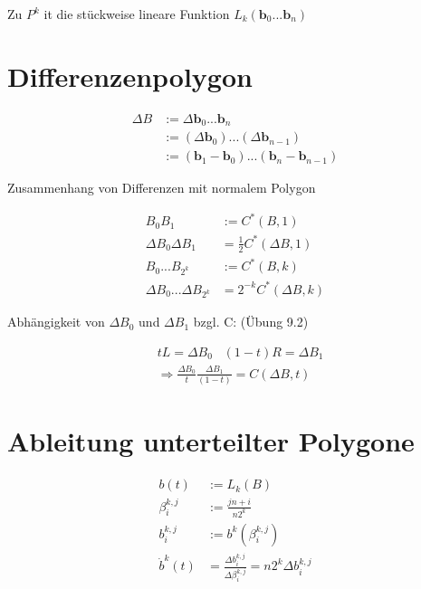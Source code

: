 \documentclass[8pt, DIV15, twocolumn]{scrartcl}
\begin{document}
Zu $P^k$ it die stückweise lineare Funktion $L_k \left( \mathbf{b}_0 ... \mathbf{b}_n \right)$

\section*{Differenzenpolygon}

\begin{equation*}
\begin{aligned}
\Delta B &:= \Delta \mathbf{b}_0 ... \mathbf{b}_n \\
&:= \left(\Delta \mathbf{b}_0 \right) ... \left( \Delta \mathbf{b}_{n-1} \right) \\
&:= \left( \mathbf{b}_1 - \mathbf{b}_0 \right) ... \left( \mathbf{b}_n - \mathbf{b}_{n-1} \right)
\end{aligned}
\end{equation*}

Zusammenhang von Differenzen mit normalem Polygon

\begin{equation*}
\begin{aligned}
B_0 B_1 &:= C^* \left(B, 1 \right) \\
\Delta B_0 \Delta B_1 &= \frac{1}{2} C^* \left(\Delta B, 1\right) \\
B_0 ... B_{2^k} &:= C^* \left(B, k \right) \\
\Delta B_0 ... \Delta B_{2^k} &= 2^{-k} C^* \left(\Delta B, k \right)
\end{aligned}
\end{equation*}

Abhängigkeit von $\Delta B_0$ und $\Delta B_1$ bzgl. C: (Übung 9.2)

\begin{equation*}
\begin{aligned}
&tL = \Delta B_0 \;\;\;
\left( 1 - t \right) R = \Delta B_1 \\
&\Rightarrow \frac{\Delta B_0}{t} \frac{\Delta B_1}{\left( 1 - t \right)} = C\left(\Delta B, t\right)
\end{aligned}
\end{equation*}

\section*{Ableitung unterteilter Polygone}

\begin{equation*}
\begin{aligned}
b \left( t \right) &:= L_k \left( B \right) \\
\beta_i^{k,j} &:= \frac{jn + i}{n 2^k} \\
b_i^{k,j} &:= b^k \left( \beta_i^{k,j} \right) \\
\dot{b}^k \left( t \right) &= \frac{\Delta b_i^{k,j}}{\Delta \beta_i^{k,j}} = n 2^k \Delta b_i^{k,j}
\end{aligned}
\end{equation*}
\end{document}
